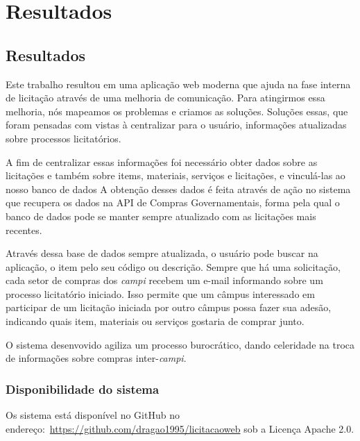 \part{Resultados}

\chapter[Resultados]{Resultados}\label{Capitulo5}

Este trabalho resultou em uma aplicação web moderna que ajuda na fase interna de licitação através de uma melhoria de comunicação.
Para atingirmos essa melhoria, nós mapeamos os problemas e criamos as soluções.
Soluções essas, que foram pensadas com vistas à centralizar para o usuário, informações atualizadas sobre processos licitatórios.

A fim de centralizar essas informações foi necessário obter dados sobre as licitações e também sobre items, materiais, serviços e licitações, e vinculá-las ao nosso banco de dados
A obtenção desses dados é feita através de ação no sistema que recupera os dados na API de Compras Governamentais, forma pela qual o banco de dados pode se manter sempre atualizado com as licitações mais recentes.

Através dessa base de dados sempre atualizada, o usuário pode buscar na aplicação, o item pelo seu código ou descrição.
Sempre que há uma solicitação, cada setor de compras dos \textit{campi} recebem um e-mail informando sobre um processo licitatório iniciado.
Isso permite que um câmpus interessado em participar de um licitação iniciada por outro câmpus possa fazer sua adesão, indicando quais item, materiais ou serviços gostaria de comprar junto.

O sistema desenvovido agiliza um processo burocrático, dando celeridade na troca de informações sobre compras inter-\textit{campi}.


\section{Disponibilidade do sistema}

Os sistema está disponível no GitHub no endereço:~\url{https://github.com/dragao1995/licitacaoweb} sob a Licença Apache 2.0.



